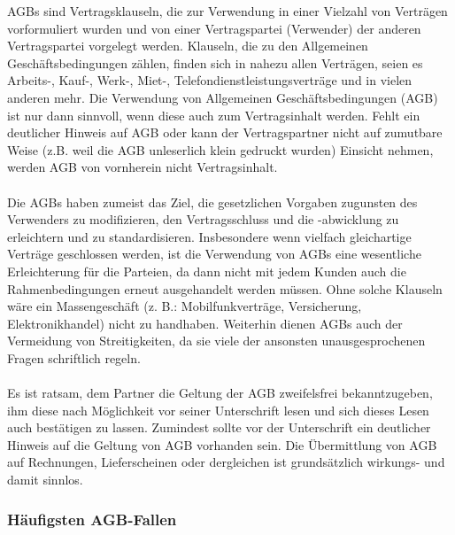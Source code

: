 \documentclass[a4paper]{article}
\begin{document}
AGBs sind Vertragsklauseln, die zur Verwendung in einer Vielzahl von Verträgen vorformuliert wurden und von einer Vertragspartei (Verwender) der anderen Vertragspartei vorgelegt werden. Klauseln, die zu den Allgemeinen Geschäftsbedingungen zählen, finden sich in nahezu allen Verträgen, seien es Arbeits-, Kauf-, Werk-, Miet-, Telefondienstleistungsverträge und in vielen anderen mehr. Die Verwendung von Allgemeinen Geschäftsbedingungen (AGB) ist nur dann sinnvoll, wenn diese auch zum Vertragsinhalt werden. Fehlt ein deutlicher Hinweis auf AGB oder kann der Vertragspartner nicht auf zumutbare Weise (z.B. weil die AGB unleserlich klein gedruckt wurden) Einsicht nehmen, werden AGB von vornherein nicht Vertragsinhalt.\\\\
Die AGBs haben zumeist das Ziel, die gesetzlichen Vorgaben zugunsten des Verwenders zu modifizieren, den Vertragsschluss und die -abwicklung zu erleichtern und zu standardisieren. Insbesondere wenn vielfach gleichartige Verträge geschlossen werden, ist die Verwendung von AGBs eine wesentliche Erleichterung für die Parteien, da dann nicht mit jedem Kunden auch die Rahmenbedingungen erneut ausgehandelt werden müssen. Ohne solche Klauseln wäre ein Massengeschäft (z. B.: Mobilfunkverträge, Versicherung, Elektronikhandel) nicht zu handhaben. Weiterhin dienen AGBs auch der Vermeidung von Streitigkeiten, da sie viele der ansonsten unausgesprochenen Fragen schriftlich regeln.\\\\
Es ist ratsam, dem Partner die Geltung der AGB zweifelsfrei bekanntzugeben, ihm diese nach Möglichkeit vor seiner Unterschrift lesen und sich dieses Lesen auch bestätigen zu lassen. Zumindest sollte vor der Unterschrift ein deutlicher Hinweis auf die Geltung von AGB vorhanden sein. Die Übermittlung von AGB auf Rechnungen, Lieferscheinen oder dergleichen ist grundsätzlich wirkungs- und damit sinnlos.

\subsubsection{Häufigsten AGB-Fallen}
\end{document}
